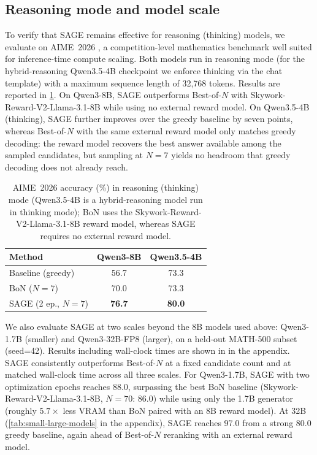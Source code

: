 \documentclass[letterpaper]{article} %
\newcommand{\method}{SAGE}
\begin{document}
{\color{blue}
\subsection{Reasoning mode and model scale}
\label{sec:scaling-exp}
To verify that \method{} remains effective for reasoning (thinking) models, we evaluate on AIME~2026 \citep{dekoninck2026beyond}, a competition-level mathematics benchmark well suited for inference-time compute scaling. Both models run in reasoning mode\textcolor{orange!85!black}{ (for the hybrid-reasoning Qwen3.5-4B checkpoint we enforce thinking via the chat template)} with a maximum sequence length of 32,768 tokens. Results are reported in \cref{tab:aime2026}. On Qwen3-8B, \method{} outperforms Best-of-\(N\) with Skywork-Reward-V2-Llama-3.1-8B \citep{liu2025skywork} while using no external reward model. On Qwen3.5-4B (thinking), \method{} further improves over the greedy baseline by seven points, \textcolor{orange!85!black}{whereas Best-of-\(N\) with the same external reward model only matches greedy decoding: the reward model recovers the best answer available among the sampled candidates, but sampling at \(N=7\) yields no headroom that greedy decoding does not already reach.}

\begin{table}[t]
\centering
\color{blue}
\small
\setlength{\tabcolsep}{5pt}
\begin{sc}
\begin{tabular}{lcc}
\toprule
\textbf{Method} & \textbf{Qwen3-8B} & \textbf{Qwen3.5-4B} \\
\midrule
Baseline (greedy)          & 56.7 & 73.3 \\
BoN ($N{=}7$)              & 70.0 & \textcolor{orange!85!black}{73.3} \\
\method{} (2 ep., $N{=}7$) & \textbf{76.7} & \textbf{80.0} \\
\bottomrule
\end{tabular}
\end{sc}
\caption{AIME~2026 accuracy (\%) in reasoning (thinking) mode (Qwen3.5-4B is a hybrid-reasoning model run in thinking mode); BoN uses the Skywork-Reward-V2-Llama-3.1-8B reward model, whereas \method{} requires no external reward model.}
\label{tab:aime2026}
\end{table}

We also evaluate \method{} at two scales beyond the 8B models used above: Qwen3-1.7B (smaller) and Qwen3-32B-FP8 (larger), on a held-out MATH-500 subset (seed=42). Results including wall-clock times are shown in  in the appendix. \method{} consistently outperforms Best-of-\(N\) at a fixed candidate count and at matched wall-clock time across all three scales. For Qwen3-1.7B, \method{} with two optimization epochs reaches 88.0, surpassing the best BoN baseline (Skywork-Reward-V2-Llama-3.1-8B, $N=70$: 86.0) while using only the 1.7B generator (roughly $5.7\times$ less VRAM than BoN paired with an 8B reward model). At 32B (\cref{tab:small-large-models} in the appendix), \method{} reaches 97.0 from a strong 80.0 greedy baseline, again ahead of Best-of-\(N\) reranking with an external reward model.

}
\end{document}
